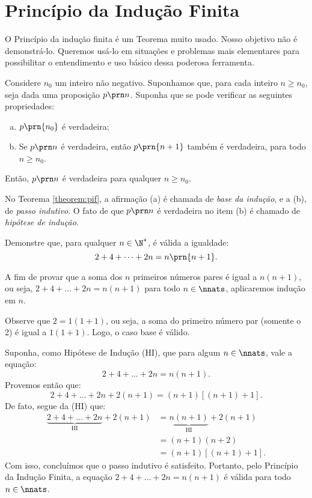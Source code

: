 \section{Princípio da Indução Finita}

O Princípio da indução finita é um Teorema muito usado. Nosso objetivo não é demonstrá-lo. Queremos usá-lo em situações e problemas mais elementares para possibilitar o entendimento e uso básico dessa poderosa ferramenta.

\begin{theorem}
\label{theorem:pif}
Considere $n_0$ um inteiro não negativo. Suponhamos que, para cada inteiro $n \geq n_0$, seja dada uma proposição $p \prn n$. Suponha
que se pode verificar as seguintes propriedades:

\begin{enumerate}[(a)]
  \item $p \prn{n_0}$ é verdadeira;
  \item Se $p \prn n$ é verdadeira, então $p \prn {n+1}$ também
  é verdadeira, para todo $n \geq n_0$.
\end{enumerate}

\noindent Então, $p \prn n$ é verdadeira para qualquer $n \geq n_0$.
\end{theorem}

\begin{remark}
No Teorema \ref{theorem:pif}, a afirmação (a) é chamada de \emph{base da indução}, e a (b), de \emph{passo indutivo}. O fato de que $p \prn n$ é verdadeira no item (b) é chamado de \emph{hipótese de indução}.
\end{remark}

\begin{example}
Demonstre que, para qualquer $n \in \N^*$, é válida a igualdade:
%
$$2+ 4+ \dots + 2n = n \prn {n+1}.$$
\end{example}


\begin{solution}
	A fim de provar que a soma dos $n$ primeiros números pares é igual a $n(n+1)$, ou seja, $2+4+\dots + 2n = n(n+1)$ para todo $n \in \nnats$, aplicaremos indução em $n$.
	
	Observe que $2 = 1(1+1)$, ou seja, a soma do primeiro número par (somente o 2) é igual a $1(1+1)$. Logo, o caso base é válido.
	
	Suponha, como Hipótese de Indução (HI), que para algum $n \in \nnats$, vale a equação:
	$$2+4+\dots+2n=n(n+1).$$
	Provemos então que:
	$$2+4+\dots + 2n + 2(n+1) = (n+1)[(n+1)+1].$$
	De fato, segue da (HI) que:
	\begin{align*}
	\underbrace{2+4+\dots+2n}_{\text{HI}} +2(n+1)	&= \underbrace{n(n+1)}_{\text{HI}} + 2(n+1) \\
	&= (n+1)(n+2) \\
	&= (n+1)[(n+1)+1].
	\end{align*}
	Com isso, concluímos que o passo indutivo é satisfeito.
	Portanto, pelo Princípio da Indução Finita, a equação $2+4+\dots + 2n=n(n+1)$ é válida para todo $n \in \nnats$.
	\end{solution}


